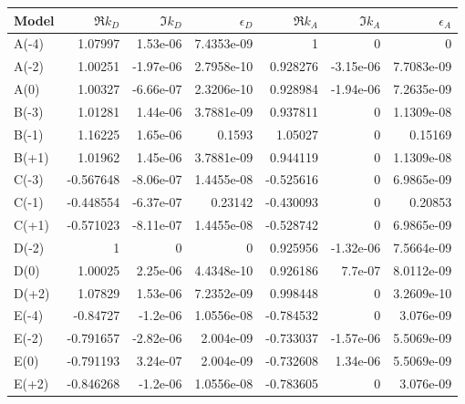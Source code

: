 \begin{tabular}{lrrrrrr}
\hline
Model & $\Re k_D$ & $\Im k_D$ & $\epsilon_D$ & $\Re k_A$ & $\Im k_A$ & $\epsilon_A$ \\
\hline
A(-4) & 1.07997 & 1.53e-06 & 7.4353e-09 & 1 & 0 & 0 \\
A(-2) & 1.00251 & -1.97e-06 & 2.7958e-10 & 0.928276 & -3.15e-06 & 7.7083e-09 \\
A(0) & 1.00327 & -6.66e-07 & 2.3206e-10 & 0.928984 & -1.94e-06 & 7.2635e-09 \\
B(-3) & 1.01281 & 1.44e-06 & 3.7881e-09 & 0.937811 & 0 & 1.1309e-08 \\
B(-1) & 1.16225 & 1.65e-06 & 0.1593 & 1.05027 & 0 & 0.15169 \\
B(+1) & 1.01962 & 1.45e-06 & 3.7881e-09 & 0.944119 & 0 & 1.1309e-08 \\
C(-3) & -0.567648 & -8.06e-07 & 1.4455e-08 & -0.525616 & 0 & 6.9865e-09 \\
C(-1) & -0.448554 & -6.37e-07 & 0.23142 & -0.430093 & 0 & 0.20853 \\
C(+1) & -0.571023 & -8.11e-07 & 1.4455e-08 & -0.528742 & 0 & 6.9865e-09 \\
D(-2) & 1 & 0 & 0 & 0.925956 & -1.32e-06 & 7.5664e-09 \\
D(0) & 1.00025 & 2.25e-06 & 4.4348e-10 & 0.926186 & 7.7e-07 & 8.0112e-09 \\
D(+2) & 1.07829 & 1.53e-06 & 7.2352e-09 & 0.998448 & 0 & 3.2609e-10 \\
E(-4) & -0.84727 & -1.2e-06 & 1.0556e-08 & -0.784532 & 0 & 3.076e-09 \\
E(-2) & -0.791657 & -2.82e-06 & 2.004e-09 & -0.733037 & -1.57e-06 & 5.5069e-09 \\
E(0) & -0.791193 & 3.24e-07 & 2.004e-09 & -0.732608 & 1.34e-06 & 5.5069e-09 \\
E(+2) & -0.846268 & -1.2e-06 & 1.0556e-08 & -0.783605 & 0 & 3.076e-09 \\
\hline
\end{tabular}
